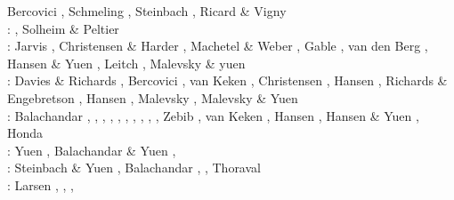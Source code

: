 \begin{scriptsize}
                     Bercovici \etal \cite{besg89}, Schmeling \cite{schm89},
                     Steinbach \etal \cite{sthe89}, Ricard \& Vigny \cite{rivi89}\\
\nineteenninety: \cite{trab90}\cite{gurn90}\cite{ketu90}, Solheim \& Peltier \cite{sope90}\\
\nineteenninetyone: Jarvis \cite{jarv91}, Christensen \& Harder \cite{chha91},
                    Machetel \& Weber \cite{mawe91}, Gable \etal \cite{gaot91},
                    van den Berg \etal \cite{vayv91}, Hansen \& Yuen \cite{hayk91},
                    Leitch \etal \cite{leys91} , Malevsky \& yuen \cite{mayu91}\\
\nineteenninetytwo: Davies \& Richards \cite{dari92}, Bercovici \etal \cite{besg92},
                    van Keken \etal{} \cite{vayv92},
                    Christensen \cite{chri92}, Hansen \etal \cite{haym92}, 
                    Richards \& Engebretson \cite{rien92}, Hansen \etal \cite{hayk92},
                    Malevsky \etal \cite{mayw92}, Malevsky \& Yuen \cite{mayu92} \\
\nineteenninetythree: Balachandar \etal \cite{bayr93}, \cite{zhch93},
                      \cite{jarv93}, \cite{tack93},
                      \cite{bucc93}, \cite{carm93},
                      \cite{vavy93}, \cite{tasg93},
                      \cite{zhgu93}, \cite{mamc93},
                      Zebib \cite{zebi93}, van Keken \etal \cite{vayv93}, 
                      Hansen \etal \cite{hayk93}, Hansen \& Yuen \cite{hayu93},
                      Honda \etal \cite{hoyb93,hoby93}\\
\nineteenninetyfour: Yuen \etal \cite{yurb94}, Balachandar \& Yuen \cite{bayu94}, \cite{haeb94}
                     \cite{chho94}\cite{tasg94}\cite{itki94}\cite{leka94}\cite{scha94}\\
\nineteenninetyfive: Steinbach \& Yuen \cite{styu95}, Balachandar \etal \cite{bayr95,bayr95b}, 
                     \cite{zhgu95}
                     \cite{vayv95}\cite{buba95}\cite{rasz95}\cite{berc95}\cite{puhj95}\cite{pujh95}
      \cite{solo95}\cite{vayu95}\cite{matb95}, Thoraval \etal \cite{thmc95}\\
\nineteenninetysix: Larsen \etal \cite{laym96}, \cite{zhyu96},
                    \cite{hond96}\cite{rytr96a}
                    \cite{rytr96b}\cite{tack96}
                    \cite{trbo96}, \cite{birg96}
                    \cite{burb96}\cite{kafo96}
                    \cite{guez96}\cite{vayu96}
                    \cite{rasz96}\cite{rasz96b}
                    \cite{leka96}\cite{iwas96}

\end{scriptsize}
